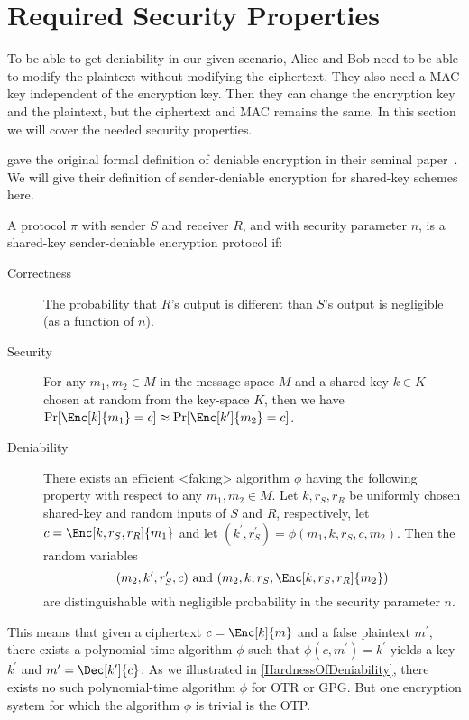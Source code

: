 \section{Required Security Properties}
\label{SecurityProperties}

To be able to get deniability in our given scenario, Alice and Bob need to be 
able to modify the plaintext without modifying the ciphertext.
They also need a \ac{MAC} key independent of the encryption key.
Then they can change the encryption key and the plaintext, but the ciphertext 
and \ac{MAC} remains the same.
In this section we will cover the needed security properties.

\citeauthor{DeniableEncryption} gave the original formal definition of deniable 
encryption in their seminal paper~\cite{DeniableEncryption}.
We will give their definition of sender-deniable encryption for shared-key 
schemes here.
\begin{definition}\label{DeniableEnc}
  A protocol \(\pi\) with sender \(S\) and receiver \(R\), and with security 
  parameter \(n\), is a shared-key sender-deniable encryption protocol if:
  \begin{description}
    \item[Correctness] The probability that \(R\)'s output is different than 
      \(S\)'s output is negligible (as a function of \(n\)).

    \item[Security] For any \(m_1, m_2\in M\) in the message-space \(M\) and 
      a shared-key \(k\in K\) chosen at random from the key-space \(K\), then 
      we have \(\Pr[ \Enc[k]{ m_1 } = c ] \approx \Pr[ \Enc[k^\prime]{ m_2 
        } = c ]\).

    \item[Deniability] There exists an efficient <faking> algorithm \(\phi\) 
      having the following property with respect to any \(m_1, m_2\in M\).
      Let \(k, r_S, r_R\) be uniformly chosen shared-key and random inputs of 
      \(S\) and \(R\), respectively, let \(c = \Enc[k, r_S, r_R]{ m_1 }\) and 
      let \((k^\prime, r_S^\prime) = \phi( m_1, k, r_S, c, m_2 )\).
      Then the random variables \[
        ( m_2, k^\prime, r_S^\prime, c ) \text{ and }
        ( m_2, k, r_S, \Enc[k, r_S, r_R]{ m_2 } )
      \] are distinguishable with negligible probability in the security 
      parameter \(n\).
  \end{description}
\end{definition}
This means that given a ciphertext \(c = \Enc[k]{ m }\) and a false plaintext 
\(m^\prime\), there exists a polynomial-time algorithm \(\phi\) such that 
\(\phi( c, m^\prime ) = k^\prime\) yields a key \(k^\prime\) and \(m^\prime 
  = \Dec[k^\prime]{ c }\).
As we illustrated in \cref{HardnessOfDeniability}, there exists no such 
polynomial-time algorithm \(\phi\) for \ac{OTR} or \ac{GPG}.
But one encryption system for which the algorithm \(\phi\) is trivial is the 
\ac{OTP}.

